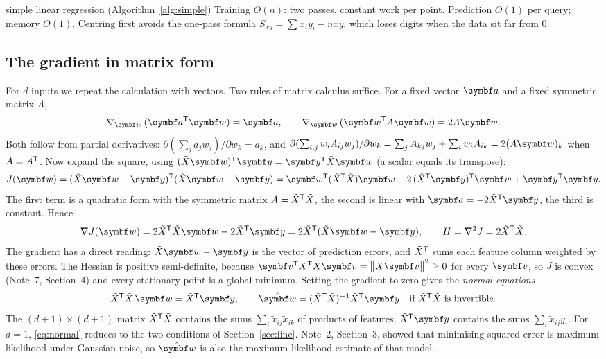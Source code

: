 \documentclass[11pt]{article}
\newcommand{\Xt}{\tilde X}
\newcommand{\w}{\vect{w}}
\newcommand{\y}{\vect{y}}
\begin{document}
\begin{runtime}{simple linear regression (Algorithm~\ref{alg:simple})}
Training $O(n)$: two passes, constant work per point. Prediction $O(1)$ per query; memory $O(1)$. Centring first
avoids the one-pass formula $S_{xy} = \sum x_i y_i - n\bar x\bar y$, which loses digits when the data sit far from $0$.
\end{runtime}

\subsection{The gradient in matrix form}\label{sec:matrixgrad}

For $d$ inputs we repeat the calculation with vectors. Two rules of matrix calculus suffice. For a fixed vector
$\vect{a}$ and a fixed symmetric matrix $A$,
\[
  \nabla_{\w}\,(\vect{a}\T\w) = \vect{a}, \qquad \nabla_{\w}\,(\w\T A\w) = 2A\w .
\]
Both follow from partial derivatives: $\partial(\sum_j a_j w_j)/\partial w_k = a_k$, and
$\partial(\sum_{i,j} w_i A_{ij} w_j)/\partial w_k = \sum_j A_{kj} w_j + \sum_i w_i A_{ik} = 2(A\w)_k$ when $A = A^{\mathsf{T}}$.
Now expand the square, using $(\Xt\w)\T\y = \y\T\Xt\w$ (a scalar equals its transpose):
\[
  J(\w) = (\Xt\w - \y)\T(\Xt\w - \y) = \w\T(\Xt\T\Xt)\w - 2\,(\Xt\T\y)\T\w + \y\T\y .
\]
The first term is a quadratic form with the symmetric matrix $A = \Xt\T\Xt$, the second is linear with
$\vect{a} = -2\Xt\T\y$, the third is constant. Hence
\[
  \nabla J(\w) = 2\Xt\T\Xt\w - 2\Xt\T\y = 2\Xt\T(\Xt\w - \y), \qquad H = \nabla^2 J = 2\Xt\T\Xt .
\]
The gradient has a direct reading: $\Xt\w - \y$ is the vector of prediction errors, and $\Xt\T$ sums each feature
column weighted by these errors. The Hessian is positive semi-definite, because
$\vect{v}\T\Xt\T\Xt\vect{v} = \norm{\Xt\vect{v}}^2 \ge 0$ for every $\vect{v}$, so $J$ is convex (Note~7, Section~4) and
every stationary point is a global minimum. Setting the gradient to zero gives the \emph{normal equations}
\begin{equation}\label{eq:normal}
  \Xt\T\Xt\, \w = \Xt\T\y, \qquad \hat{\w} = (\Xt\T\Xt)^{-1}\Xt\T\y \quad\text{if } \Xt\T\Xt \text{ is invertible.}
\end{equation}
The $(d+1) \times (d+1)$ matrix $\Xt\T\Xt$ contains the sums $\sum_i \tilde x_{ij}\tilde x_{ik}$ of products of features;
$\Xt\T\y$ contains the sums $\sum_i \tilde x_{ij} y_i$. For $d = 1$, \eqref{eq:normal} reduces to the two conditions of
Section~\ref{sec:line}. Note~2, Section~3, showed that minimising squared error is maximum likelihood under Gaussian
noise, so $\hat{\w}$ is also the maximum-likelihood estimate of that model.
\end{document}
